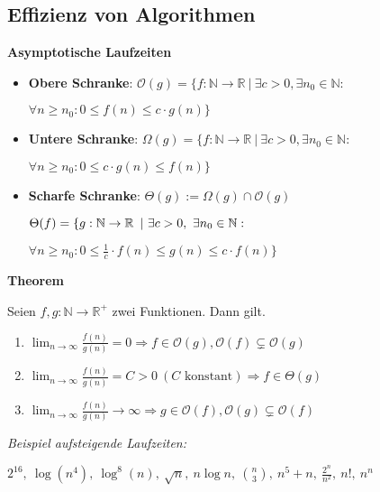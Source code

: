 \begin{sectionbox}
\subsection{Effizienz von Algorithmen}\smallskip

\textbf{Asymptotische Laufzeiten}\par
\begin{itemize}
    \item \textbf{Obere Schranke}: $\mathcal{O}(g)=\{f:\mathbb{N} \rightarrow \mathbb{R}\ |\ \exists c>0, \exists n_{0} \in \mathbb{N}:$\par $\forall n \geq n_{0}: 0 \leq f(n) \leq c \cdot g(n)\}$
    \item \textbf{Untere Schranke}: $\Omega(g)=\{f: \mathbb{N} \rightarrow \mathbb{R}\ |\ \exists c>0, \exists n_{0} \in \mathbb{N}:$ \par $\forall n \geq n_{0}: 0 \leq c \cdot g(n) \leq f(n)\}$
    \item \textbf{Scharfe Schranke}: $\Theta(g):=\Omega(g) \cap \mathcal{O}(g)$\par
    $\Theta(f) = \{  g: \N \rightarrow \R\ |\ \exists c>0,\ \exists n_0 \in \N:$\par $\forall n \geq n_0: 0 \leq \frac1c \cdot f(n)\leq g(n) \leq c \cdot f(n)\}$
\end{itemize}\par\smallskip

\begin{greenbox}
\textbf{Theorem}\par
Seien $f, g: \mathbb{N} \rightarrow \mathbb{R}^{+}$ zwei Funktionen. Dann gilt.
\begin{enumerate}
    \item $\lim _{n \rightarrow \infty}\limits \frac{f(n)}{g(n)}=0 \Rightarrow f \in \mathcal{O}(g), \mathcal{O}(f) \subsetneq \mathcal{O}(g)$
    \item $\lim _{n \rightarrow \infty}\limits \frac{f(n)}{g(n)}=C>0\ (C \text { konstant}) \Rightarrow f \in \Theta(g)$
    \item $\lim _{n \rightarrow \infty}\limits \frac{f(n)}{g(n)} \longrightarrow \infty \Rightarrow g \in \mathcal{O}(f), \mathcal{O}(g) \subsetneq \mathcal{O}(f)$
\end{enumerate}
\end{greenbox}\smallskip
\textit{Beispiel aufsteigende Laufzeiten:}\par
$ 2^{16},\ \log(n^4),\ \log^8(n),\ \sqrt{n},\ n\log n,\ \binom{n}{3},\ n^5+n,\ \frac{2^n}{n^2},\ n!,\ n^n$\par\smallskip


\end{sectionbox}

